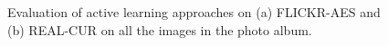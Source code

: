\documentclass[10pt,twocolumn,letterpaper]{article}
\begin{document}
\begin{figure}
\begin{center}
\end{center}
\vspace{-0.1in}
\caption{Evaluation of active learning approaches on (a) FLICKR-AES and (b) REAL-CUR on all the images in the photo album.
\vspace{-0.1in}
\label{fig:testresults}}
\end{figure}
\end{document}
